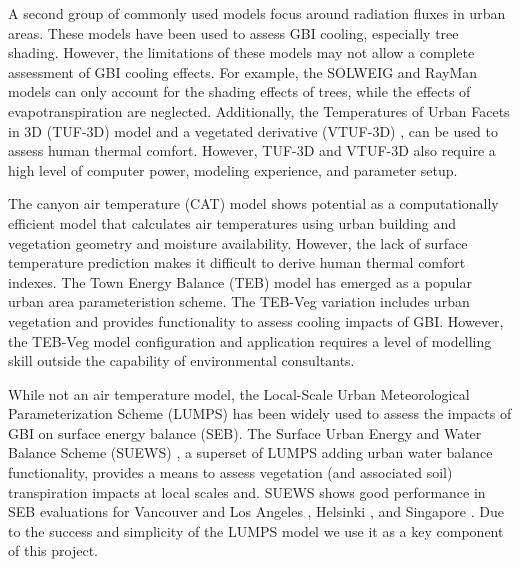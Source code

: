 \documentclass[gmd, manuscript]{copernicus}
\begin{document}
A second group of commonly used models focus around radiation fluxes in urban areas. These models have been used to assess GBI cooling, especially tree shading. However, the limitations of these models may not allow a complete assessment of GBI cooling effects. For example, the SOLWEIG \citep{Lindberg2008a} and RayMan \citep{Matzarakis2007,Matzarakis2010} models can only account for the shading effects of trees, while the effects of evapotranspiration are neglected. Additionally, the Temperatures of Urban Facets in 3D (TUF-3D) model \citep{Krayenhoff2007b} and a vegetated derivative (VTUF-3D) \citep{nice2018}, can be used to assess human thermal comfort. However, TUF-3D and VTUF-3D also require a high level of computer power, modeling experience, and parameter setup.  

The canyon air temperature (CAT) model \citep{Erell2006} shows potential as a computationally efficient model that calculates air temperatures using urban building and vegetation geometry and moisture availability. However, the lack of surface temperature prediction makes it difficult to derive human thermal comfort indexes. The Town Energy Balance (TEB) model \citep{Masson2000} has emerged as a popular urban area parameteristion scheme. The TEB-Veg \citep{Lemonsu2012,redon2017} variation includes  urban vegetation and provides functionality to assess cooling impacts of GBI. However, the TEB-Veg model configuration and application requires a  level of modelling skill outside the capability of environmental  consultants. 

While not an air temperature model, the Local-Scale Urban Meteorological Parameterization Scheme (LUMPS) \citep{Grimmond2002a} has been widely used  to assess the impacts of GBI on surface energy balance (SEB). The Surface Urban Energy and Water Balance Scheme (SUEWS) \citep{Jarvi2011}, a superset of LUMPS adding urban water balance functionality, provides a means to assess vegetation (and associated soil) transpiration impacts at local scales and. SUEWS shows good performance in SEB evaluations for Vancouver and Los Angeles \citep{Jarvi2011}, Helsinki \citep{Jarvi2014a}, and Singapore \citep{demuzere2017impact}. Due to the success and simplicity of the LUMPS model we use it as a key component of this project.  
\end{document}
